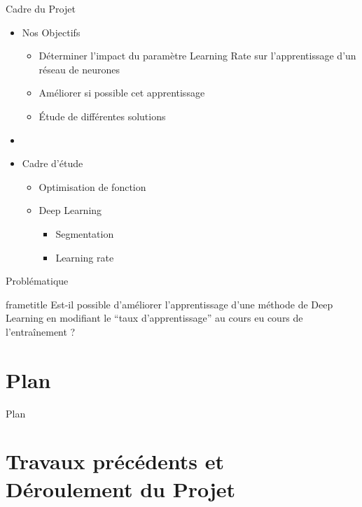\documentclass{beamer}
\begin{document}
\begin{frame}{Cadre du Projet}
  \begin{itemize}
    \item Nos Objectifs
    \begin{itemize}
      \item Déterminer l'impact du paramètre Learning Rate sur l'apprentissage d'un réseau de neurones
      \item Améliorer si possible cet apprentissage
      \item \'Etude de différentes solutions
    \end{itemize}
    \item[]
    \item Cadre d'étude
    \begin{itemize}
      \item Optimisation de fonction
      \item Deep Learning
      \begin{itemize}
        \item Segmentation
        \item Learning rate
      \end{itemize}
    \end{itemize}
  \end{itemize}
\end{frame}

\begin{frame}{Problématique}
  \begin{beamercolorbox}[ht=8ex,dp=1.5ex,center]{frametitle}
    Est-il possible d'améliorer l'apprentissage d'une méthode de Deep Learning en modifiant le ``taux d'apprentissage'' au cours eu cours de l'entraînement ?
  \end{beamercolorbox}
\end{frame}

\section*{Plan}
\begin{frame}{Plan}
  \tableofcontents
\end{frame}

\section[Travaux précédents -- Déroulement]{Travaux précédents et Déroulement du Projet}

\subsection*{}
\end{document}
